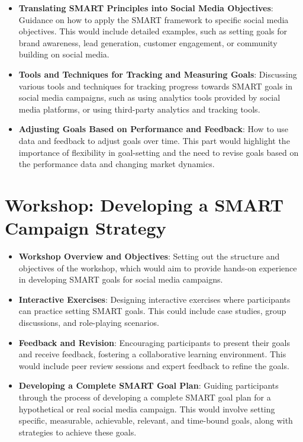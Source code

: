 \documentclass[
]{book}
\providecommand{\tightlist}{%
  \setlength{\itemsep}{0pt}\setlength{\parskip}{0pt}}
\begin{document}
\begin{itemize}
\tightlist
\item
  \textbf{Translating SMART Principles into Social Media Objectives}: Guidance on how to apply the SMART framework to specific social media objectives. This would include detailed examples, such as setting goals for brand awareness, lead generation, customer engagement, or community building on social media.
\item
  \textbf{Tools and Techniques for Tracking and Measuring Goals}: Discussing various tools and techniques for tracking progress towards SMART goals in social media campaigns, such as using analytics tools provided by social media platforms, or using third-party analytics and tracking tools.
\item
  \textbf{Adjusting Goals Based on Performance and Feedback}: How to use data and feedback to adjust goals over time. This part would highlight the importance of flexibility in goal-setting and the need to revise goals based on the performance data and changing market dynamics.
\end{itemize}

\hypertarget{workshop-developing-a-smart-campaign-strategy}{%
\section*{Workshop: Developing a SMART Campaign Strategy}\label{workshop-developing-a-smart-campaign-strategy}}

\begin{itemize}
\tightlist
\item
  \textbf{Workshop Overview and Objectives}: Setting out the structure and objectives of the workshop, which would aim to provide hands-on experience in developing SMART goals for social media campaigns.
\item
  \textbf{Interactive Exercises}: Designing interactive exercises where participants can practice setting SMART goals. This could include case studies, group discussions, and role-playing scenarios.
\item
  \textbf{Feedback and Revision}: Encouraging participants to present their goals and receive feedback, fostering a collaborative learning environment. This would include peer review sessions and expert feedback to refine the goals.
\item
  \textbf{Developing a Complete SMART Goal Plan}: Guiding participants through the process of developing a complete SMART goal plan for a hypothetical or real social media campaign. This would involve setting specific, measurable, achievable, relevant, and time-bound goals, along with strategies to achieve these goals.
\end{itemize}
\end{document}
